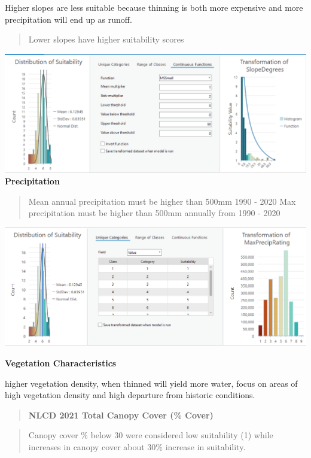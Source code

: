 \documentclass[
]{agujournal2019}
\begin{document}
Higher slopes are less suitable because thinning is both more expensive
and more precipitation will end up as runoff.

\begin{quote}
Lower slopes have higher suitability scores
\end{quote}

\includegraphics{images/Slope_suitability.PNG} \textbf{Precipitation}

\begin{quote}
Mean annual precipitation must be higher than 500mm 1990 - 2020 Max
precipitation must be higher than 500mm annually from 1990 - 2020
\end{quote}

\includegraphics{images/Precipitation_suitability.PNG}

\textbf{Vegetation Characteristics}

higher vegetation density, when thinned will yield more water, focus on
areas of high vegetation density and high departure from historic
conditions.

\begin{quote}
\textbf{NLCD 2021 Total Canopy Cover (\% Cover)}
\end{quote}

\begin{quote}
Canopy cover \% below 30 were considered low suitability (1) while
increases in canopy cover about 30\% increase in suitability.
\end{quote}
\end{document}
